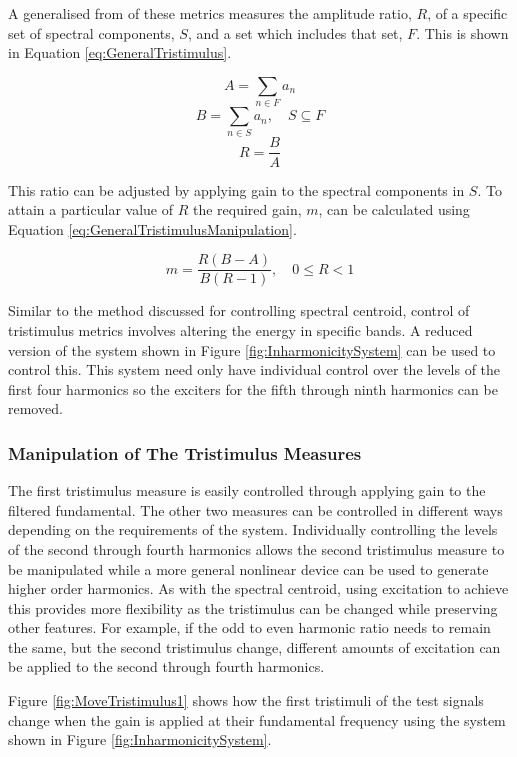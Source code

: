 		A generalised from of these metrics measures the amplitude ratio, $R$, of a specific set of spectral
		components, $S$, and a set which includes that set, $F$. This is shown in Equation
		\ref{eq:GeneralTristimulus}.

		\[ A = \sum_{n \in F} a_{n} \]
		\[ B = \sum_{n \in S} a_{n}, \quad S \subseteq F \]
		\begin{equation}
			R = \frac{B}{A}
			\label{eq:GeneralTristimulus}
		\end{equation}

		This ratio can be adjusted by applying gain to the spectral components in $S$. To attain a particular value
		of $R$ the required gain, $m$, can be calculated using Equation \ref{eq:GeneralTristimulusManipulation}.

		\begin{equation}
			m = \frac{R(B - A)}{B(R - 1)}, \quad 0 \leq R < 1
			\label{eq:GeneralTristimulusManipulation}
		\end{equation}

		Similar to the method discussed for controlling spectral centroid, control of tristimulus metrics involves
		altering the energy in specific bands. A reduced version of the system shown in Figure
		\ref{fig:InharmonicitySystem} can be used to control this. This system need only have individual control
		over the levels of the first four harmonics so the exciters for the fifth through ninth harmonics can be
		removed.

		\subsubsection*{Manipulation of The Tristimulus Measures}
			The first tristimulus measure is easily controlled through applying gain to the filtered
			fundamental. The other two measures can be controlled in different ways depending on the
			requirements of the system.  Individually controlling the levels of the second through fourth
			harmonics allows the second tristimulus measure to be manipulated while a more general nonlinear
			device can be used to generate higher order harmonics. As with the spectral centroid, using
			excitation to achieve this provides more flexibility as the tristimulus can be changed while
			preserving other features. For example, if the odd to even harmonic ratio needs to remain the same,
			but the second tristimulus change, different amounts of excitation can be applied to the second
			through fourth harmonics.

			Figure \ref{fig:MoveTristimulus1} shows how the first tristimuli of the test signals change when
			the gain is applied at their fundamental frequency using the system shown in Figure
			\ref{fig:InharmonicitySystem}.

